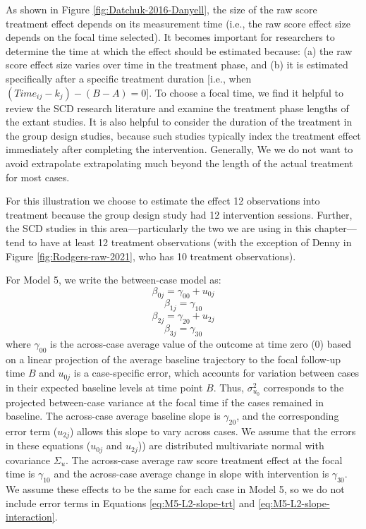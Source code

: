 \documentclass[
]{book}
\begin{document}
As shown in Figure \ref{fig:Datchuk-2016-Danyell},
the size of the raw score treatment effect depends on its measurement time (i.e., the raw score effect size depends on the focal time selected). It becomes important for researchers to determine the time at which the effect should be estimated because: (a) the raw score effect size varies over time in the treatment phase, and (b) it is estimated specifically after a specific treatment duration {[}i.e., when \((Time_{ij}-k_j)-(B-A)=0\){]}. To choose a focal time, we find it helpful to review the SCD research literature and examine the treatment phase lengths of the extant studies. It is also helpful to consider the duration of the treatment in the group design studies, because such studies typically index the treatment effect immediately after completing the intervention. Generally, We we do not want to avoid extrapolate extrapolating much beyond the length of the actual treatment for most cases.

For this illustration we choose to estimate the effect 12 observations into treatment because the group design study \citep{hebert2018Writing} had 12 intervention sessions. Further, the SCD studies in this area---particularly the two we are using in this chapter---tend to have at least 12 treatment observations (with the exception of Denny in Figure \ref{fig:Rodgers-raw-2021}, who has 10 treatment observations).

For Model 5, we write the between-case model as:
\begin{equation}
\label{eq:M5-L2-intercept}
\beta_{0j} = \gamma_{00} + u_{0j}
\end{equation}
\begin{equation}
\label{eq:M5-L2-slope-trt}
\beta_{1j} = \gamma_{10}
\end{equation}
\begin{equation}
\label{eq:M5-L2-slope-time}
\beta_{2j} = \gamma_{20} + u_{2j}
\end{equation}
\begin{equation}
\label{eq:M5-L2-slope-interaction}
\beta_{3j} = \gamma_{30}
\end{equation}
where \(\gamma_{00}\) is the across-case average value of the outcome at time zero (0) based on a linear projection of the average baseline trajectory to the focal follow-up time \(B\) and \(u_{0j}\) is a case-specific error, which accounts for variation between cases in their expected baseline levels at time point \(B\). Thus, \(\sigma_{u_0}^2\) corresponds to the projected between-case variance at the focal time if the cases remained in baseline. The across-case average baseline slope is \(\gamma_{20}\), and the corresponding error term (\(u_{2j}\)) allows this slope to vary across cases. We assume that the errors in these equations (\(u_{0j}\) and \(u_{2j}\))) are distributed multivariate normal with covariance \(\Sigma_u\). The across-case average raw score treatment effect at the focal time is \(\gamma_{10}\) and the across-case average change in slope with intervention is \(\gamma_{30}\). We assume these effects to be the same for each case in Model 5, so we do not include error terms in Equations \eqref{eq:M5-L2-slope-trt} and \eqref{eq:M5-L2-slope-interaction}.
\end{document}
